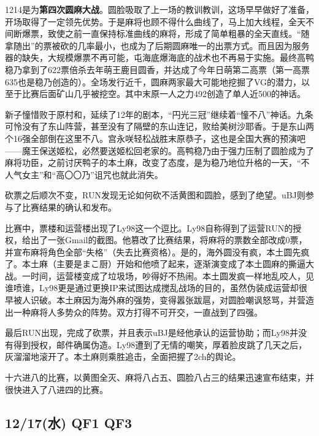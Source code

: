 1214是为\textbf{第四次圆麻大战}。圆脸吸取了上一场的教训教训，这场早早做好了准备，开场取得了一定领先优势。于是麻将也顾不得什么曲线了，马上加大线程，全天不间断爆票，致使之前一直保持标准曲线的麻将，形成了简单粗暴的全天直线。“随拿随出”的票被砍的几率最小，也成为了后期圆麻唯一的出票方式。而且因为服务器的缺失，大规模爆票不再可能，屯海底爆海底的战术也不再易于实施。最终高鸭稳乃拿到了622票倍杀去年萌王鹿目圆香，并达成了今年日萌第二高票（第一高票635也是稳乃创造的）。全场发行近千，圆麻两家最大可能地挖掘了VG的潜力，以至于比赛后面矿山几乎被挖空。其中末原一人之力492创造了单人近500的神话。

新子憧惜败于原村和，延续了12年的剧本，“円光三冠”继续着“憧不八”神话。九条可怜没有了东山阵营，甚至没有了隔壁的东山连记，败给美树沙耶香。于是东山两个16强全部倒在这里不八。宫永咲轻松战胜末原恭子，这也是全国大赛的预演吧——魔王保送姬松，必然要送姬松回老家的。高鸭稳乃由于强力压制了圆脸成为了麻将功臣，之前讨厌鸭子的本土麻，改变了态度，是为稳乃地位升格的一天，“不人气女主”和“高〇〇乃”诅咒也就此消失。

砍票之后顺次不变，RUN发现无论如何砍不活黄图和圆脸，感到了绝望。uBJ则参与了比赛结果的确认和发布。

比赛中，票楼和运营楼出现了Ly98这一个逗比。Ly98自称得到了运营RUN的授权，给出了一张Gmail的截图。他篡改了比赛结果，将麻将的票数全部改成0票，并宣布麻将角色全部“失格”（失去比赛资格）。是的，海外圆没有疯，本土圆先疯了。本土麻（主要是まこ厨）开始和他喷了起来，逐渐演变成了本土圆麻的撕逼大战。一时间，运营楼变成了垃圾场，吵得好不热闹。本土圆发疯一样地乱咬人，见谁喷谁，Ly98更是通过更换IP来试图达成搅乱战场的目的，虽然伪装成运营却很早被人识破。本土麻因为海外麻的强势，变得嚣张跋扈，对圆脸嘲讽怒骂，并营造出一种麻将人多势众的阵势。双方打得不可开交，一直战到了四强。

最后RUN出现，完成了砍票，并且表示uBJ是经他承认的运营协助；而Ly98并没有得到授权，邮件确属伪造。Ly98遭到了无情的嘲笑，厚着脸皮跳了几天之后，灰溜溜地滚开了。本土麻则乘胜追击，全面把握了2ch的舆论。

十六进八的比赛，以黄图全灭、麻将八占五、圆脸八占三的结果迅速宣布结束，并很快进入了八进四的比赛。

\subsection{12/17(水) QF1 QF3}


